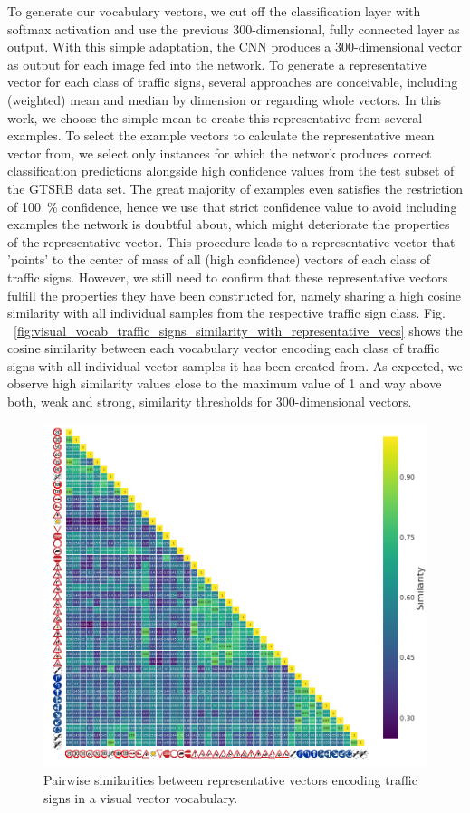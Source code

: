 To generate our vocabulary vectors, we cut off the classification layer with softmax activation and use the previous \num{300}-dimensional, fully connected layer as output.
With this simple adaptation, the \ac{CNN} produces a \num{300}-dimensional vector as output for each image fed into the network. 
To generate a representative vector for each class of traffic signs, several approaches are conceivable, including (weighted) mean and median by dimension or regarding whole vectors.
In this work, we choose the simple mean to create this representative from several examples.
To select the example vectors to calculate the representative mean vector from, we select only instances for which the network produces correct classification predictions alongside high confidence values from the test subset of the \ac{GTSRB} data set.
The great majority of examples even satisfies the restriction of \SI{100}{\percent} confidence, hence we use that strict confidence value to avoid including examples the network is doubtful about, which might deteriorate the properties of the representative vector. 
This procedure leads to a representative vector that 'points' to the center of mass of all (high confidence) vectors of each class of traffic signs.
However, we still need to confirm that these representative vectors fulfill the properties they have been constructed for, namely sharing a high cosine similarity with all individual samples from the respective traffic sign class.
Fig. ~\ref{fig:visual_vocab_traffic_signs_similarity_with_representative_vecs} shows the cosine similarity between each vocabulary vector encoding each class of traffic signs with all individual vector samples it has been created from.
As expected, we observe high similarity values close to the maximum value of \num{1} and way above both, weak and strong, similarity thresholds for \num{300}-dimensional vectors.

\begin{figure}[t]
    \centering
    \includegraphics[width=0.8\linewidth]{imgs/visual_vocab_traffic_signs_internal_similarities.png}
    \caption{Pairwise similarities between representative vectors encoding traffic signs in a visual vector vocabulary.}
    \label{fig:visual_vocab_traffic_signs_internal_similarities}
\end{figure}

